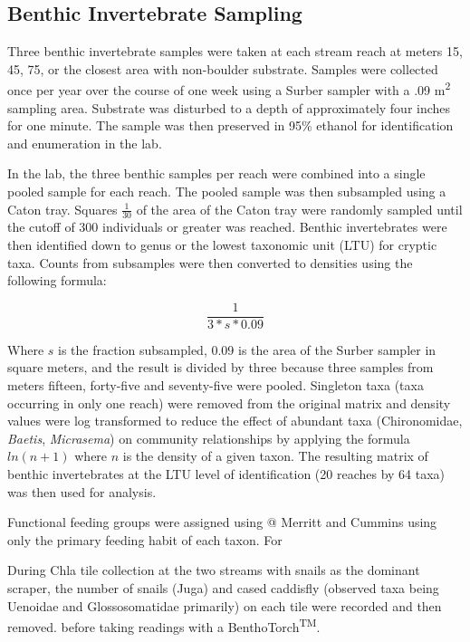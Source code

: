 \documentclass[double,12pt]{beavtex}
\begin{document}
  \subsection*{Benthic Invertebrate
  Sampling}\label{benthic-invertebrate-sampling}
  
  Three benthic invertebrate samples were taken at each stream reach at
  meters 15, 45, 75, or the closest area with non-boulder substrate.
  Samples were collected once per year over the course of one week using a
  Surber sampler with a .09 m\textsuperscript{2} sampling area. Substrate
  was disturbed to a depth of approximately four inches for one minute.
  The sample was then preserved in 95\% ethanol for identification and
  enumeration in the lab.
  
  In the lab, the three benthic samples per reach were combined into a
  single pooled sample for each reach. The pooled sample was then
  subsampled using a Caton tray. Squares \(\frac{1} {30}\) of the area of
  the Caton tray were randomly sampled until the cutoff of 300 individuals
  or greater was reached. Benthic invertebrates were then identified down
  to genus or the lowest taxonomic unit (LTU) for cryptic taxa. Counts
  from subsamples were then converted to densities using the following
  formula:
  
  \begin{equation}
  \frac{1}{3*s*0.09}
  \end{equation}
  
  Where \(s\) is the fraction subsampled, 0.09 is the area of the Surber
  sampler in square meters, and the result is divided by three because
  three samples from meters fifteen, forty-five and seventy-five were
  pooled. Singleton taxa (taxa occurring in only one reach) were removed
  from the original matrix and density values were log transformed to
  reduce the effect of abundant taxa (Chironomidae, \emph{Baetis},
  \emph{Micrasema}) on community relationships by applying the formula
  \(ln(n + 1)\) where \(n\) is the density of a given taxon. The resulting
  matrix of benthic invertebrates at the LTU level of identification (20
  reaches by 64 taxa) was then used for analysis.
  
  Functional feeding groups were assigned using @ Merritt and Cummins
  using only the primary feeding habit of each taxon. For
  
  During Chla tile collection at the two streams with snails as the
  dominant scraper, the number of snails (Juga) and cased caddisfly
  (observed taxa being Uenoidae and Glossosomatidae primarily) on each
  tile were recorded and then removed. before taking readings with a
  BenthoTorch\textsuperscript{TM}.
  
\end{document}

